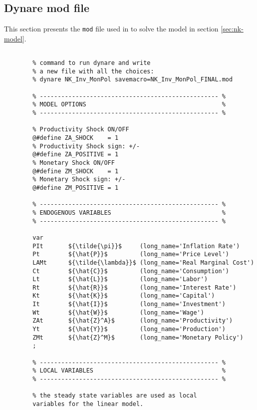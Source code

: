 \documentclass[
thesis.tex
]{subfiles}
\begin{document}
\newpage

\subsection{Dynare mod file}

This section presents the \texttt{mod} file used in \dynare to solve the model in section \ref{sec:nk-model}.

\vspace*{-0.5cm}

{\singlespacing
	
	\begin{verbatim} 
		
		% command to run dynare and write
		% a new file with all the choices:
		% dynare NK_Inv_MonPol savemacro=NK_Inv_MonPol_FINAL.mod
		
		% -------------------------------------------------- %
		% MODEL OPTIONS                                      %
		% -------------------------------------------------- %
		
		% Productivity Shock ON/OFF
		@#define ZA_SHOCK    = 1
		% Productivity Shock sign: +/-
		@#define ZA_POSITIVE = 1
		% Monetary Shock ON/OFF
		@#define ZM_SHOCK    = 1
		% Monetary Shock sign: +/-
		@#define ZM_POSITIVE = 1
		
		% -------------------------------------------------- %
		% ENDOGENOUS VARIABLES                               %
		% -------------------------------------------------- %
		
		var
		PIt       ${\tilde{\pi}}$     (long_name='Inflation Rate')
		Pt        ${\hat{P}}$         (long_name='Price Level')
		LAMt      ${\tilde{\lambda}}$ (long_name='Real Marginal Cost')
		Ct        ${\hat{C}}$         (long_name='Consumption')
		Lt        ${\hat{L}}$         (long_name='Labor')
		Rt        ${\hat{R}}$         (long_name='Interest Rate')
		Kt        ${\hat{K}}$         (long_name='Capital')
		It        ${\hat{I}}$         (long_name='Investment')
		Wt        ${\hat{W}}$         (long_name='Wage')
		ZAt       ${\hat{Z}^A}$       (long_name='Productivity')
		Yt        ${\hat{Y}}$         (long_name='Production')
		ZMt       ${\hat{Z}^M}$       (long_name='Monetary Policy')
		;
		
		% -------------------------------------------------- %
		% LOCAL VARIABLES                                    %
		% -------------------------------------------------- %
		
		% the steady state variables are used as local 
		variables for the linear model.
		

\end{verbatim}}
\end{document}
